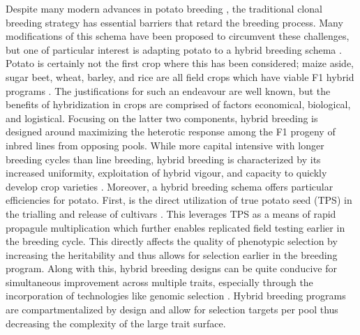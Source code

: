 \begin{refsection}
Despite many modern advances in potato breeding \parencite{Bethke2019},
the traditional clonal breeding strategy has essential barriers that
retard the breeding process. Many modifications of this schema have been
proposed to circumvent these challenges, but one of particular interest
is adapting potato to a hybrid breeding schema
\parencite{Lindhout2011,Jansky2018,Bradshaw2022}. Potato is certainly not
the first crop where this has been considered; maize aside, sugar beet,
wheat, barley, and rice are all field crops which have viable F1 hybrid
programs \parencite{Crow1998}. The justifications for such an endeavour
are well known, but the benefits of hybridization in crops are comprised
of factors economical, biological, and logistical. Focusing on the
latter two components, hybrid breeding is designed around maximizing the
heterotic response among the F1 progeny of inbred lines from opposing
pools. While more capital intensive with longer breeding cycles than
line breeding, hybrid breeding is characterized by its increased
uniformity, exploitation of hybrid vigour, and capacity to quickly
develop crop varieties \parencite{Cowling2020,Labroo2021}. Moreover, a
hybrid breeding schema offers particular efficiencies for potato. First,
is the direct utilization of true potato seed (TPS) in the trialling and
release of cultivars \parencite{Almekinders1996,Stockem2021}. This
leverages TPS as a means of rapid propagule multiplication which further
enables replicated field testing earlier in the breeding cycle. This
directly affects the quality of phenotypic selection by increasing the
heritability and thus allows for selection earlier in the breeding
program. Along with this, hybrid breeding designs can be quite conducive
for simultaneous improvement across multiple traits, especially through
the incorporation of technologies like genomic selection
\parencite{Zhao2015,Peixoto2024}. Hybrid breeding programs are
compartmentalized by design and allow for selection targets per pool
thus decreasing the complexity of the large trait surface.


\end{refsection}
